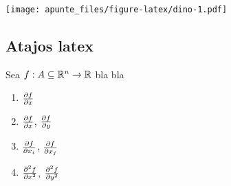 \documentclass[letterpaper,twoside, 10pt]{article}
\begin{document}
{\texttt{[image: apunte\_files/figure-latex/dino-1.pdf]}

\hypertarget{atajos-latex}{%
\subsection{Atajos latex}\label{atajos-latex}}

Sea \(\f1\) bla bla

\begin{enumerate}
\def\labelenumi{\arabic{enumi}.}
\tightlist
\item
  \(\frac{\partial f}{\partial x}\)
\item
  \(\frac{\partial f}{\partial x}\), \(\frac{\partial f}{\partial y}\)
\item
  \(\frac{\partial f}{\partial x_i}\), \(\frac{\partial f}{\partial x_j}\)
\item
  \(\frac{\partial^2 f}{\partial x^2}\), \(\frac{\partial^2 f}{\partial y^2}\)
\end{enumerate}}
\end{document}
